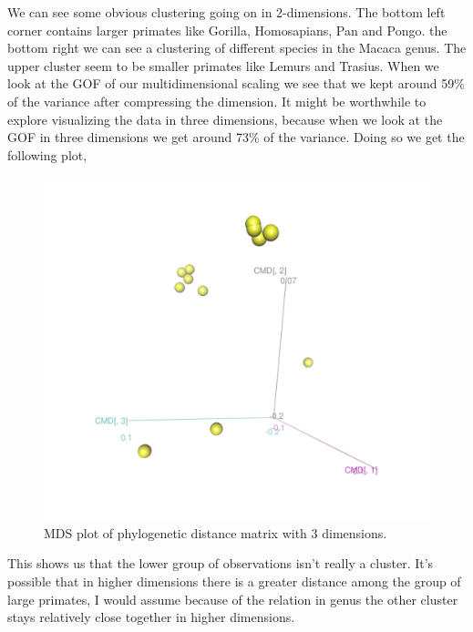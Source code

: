 \documentclass[12pt]{article}
\makeatletter
\theoremstyle{homework}
\newenvironment{exercise}[1]
{\def\@currentlabel{#1}\exercisecore}
{\endexercisecore}
\makeatother
\begin{document}
\begin{exercise}{2}
    We can see some obvious clustering going on in 2-dimensions. The bottom left corner contains larger primates like Gorilla, Homosapians, Pan and Pongo. 
    the bottom right we can see a clustering of different species in the Macaca genus. The upper cluster seem to be smaller primates like Lemurs and Trasius. 
    When we look at the GOF of our multidimensional scaling we see that we kept around 59\% of the variance after compressing the dimension. It might be worthwhile to explore
    visualizing the data in three dimensions, because when we look at the GOF in three dimensions we get around 73\% of the variance. Doing so we get the following plot, 
    \begin{figure}[H]
      \begin{center}
        \caption{MDS plot of phylogenetic distance matrix with 3 dimensions.}
      \includegraphics[width = \textwidth]{Rplot02.png}
      \end{center}
    \end{figure}
    This shows us that the lower group of observations isn't really a cluster. It's possible that in higher dimensions there is a greater distance among the group of large primates, I would assume because of 
    the relation in genus the other cluster stays relatively close together in higher dimensions.  
\end{exercise}
\vspace{1in}
\end{document}
